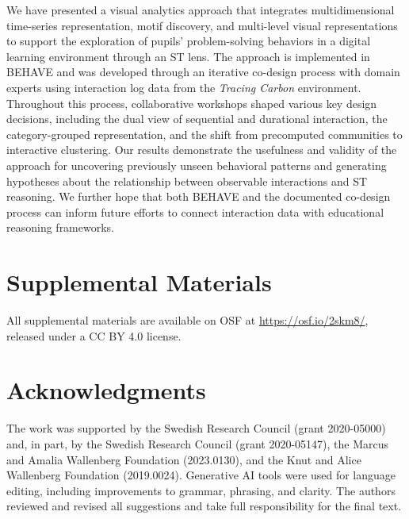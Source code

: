 \documentclass[letterpaper,journal]{IEEEtran}
\begin{document}
We have presented a visual analytics approach that integrates multidimensional time-series representation, motif discovery, and multi-level visual representations to support the exploration of pupils' problem-solving behaviors in a digital learning environment through an ST lens.
The approach is implemented in \textsc{BEHAVE} and was developed through an iterative co-design process with domain experts using interaction log data from the \textit{Tracing Carbon} environment. 
Throughout this process, collaborative workshops shaped various key design decisions, including the dual view of sequential and durational interaction, the category-grouped representation, and the shift from precomputed communities to interactive clustering.
Our results demonstrate the usefulness and validity of the approach for uncovering previously unseen behavioral patterns and generating hypotheses about the relationship between observable interactions and ST reasoning.
We further hope that both \textsc{BEHAVE} and the documented co-design process can inform future efforts to connect interaction data with educational reasoning frameworks.





\section*{Supplemental Materials}
\label{sec:supplemental_materials}

All supplemental materials are available on OSF at \url{https://osf.io/2skm8/}, released under a CC BY 4.0 license.





\section*{Acknowledgments}
The work was supported by the Swedish Research Council (grant 2020-05000) and, in part, by the Swedish Research Council (grant 2020-05147), the Marcus and Amalia Wallenberg Foundation (2023.0130), and the Knut and Alice Wallenberg Foundation (2019.0024).
Generative AI tools were used for language editing, including improvements to grammar, phrasing, and clarity. 
The authors reviewed and revised all suggestions and take full responsibility for the final text. 


 



\newpage

 
\vspace{11pt}


\vspace{11pt}


\vfill
\end{document}
